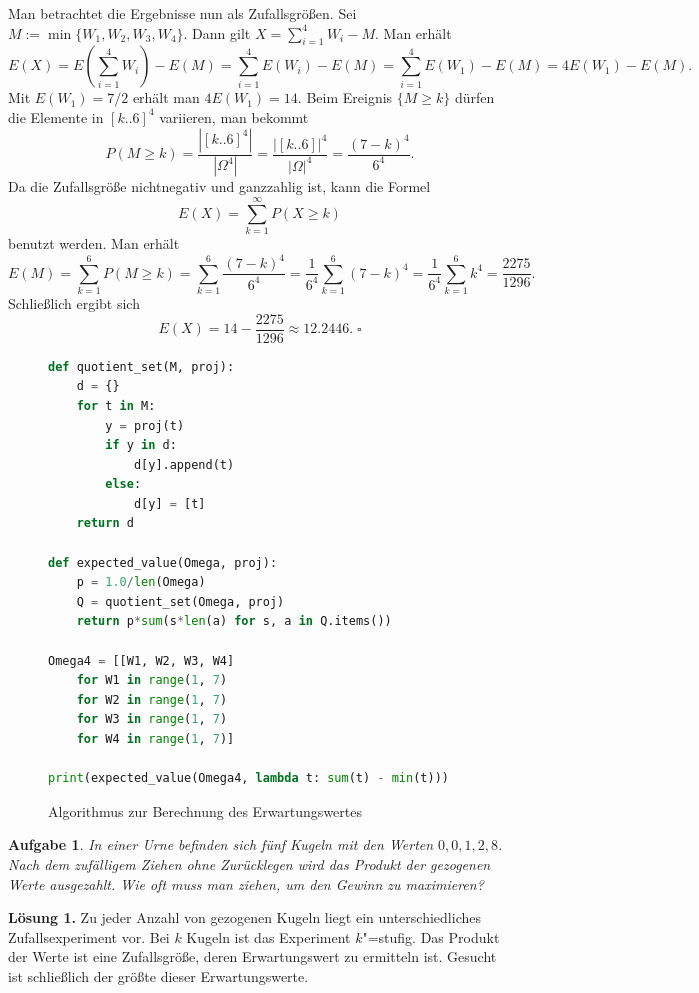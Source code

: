 \documentclass[a4paper,10pt,fleqn,twoside]{scrartcl}
\numberwithin{equation}{section}
\newcommand{\strong}[1]{{\normalfont\sffamily\bfseries #1}}
\renewcommand{\qedsymbol}{\ensuremath{\square}}
\theoremstyle{Aufgabe}
\newtheorem{Aufgabe}{\sffamily Aufgabe}[section]
\begin{document}
Man betrachtet die Ergebnisse nun als Zufallsgrößen. Sei
$M:=\min\{W_1,W_2,W_3,W_4\}$. Dann gilt $X=\sum_{i=1}^4 W_i-M$.
Man erhält
\[E(X) = E(\sum_{i=1}^4 W_i)-E(M) = \sum_{i=1}^4 E(W_i)-E(M)
= \sum_{i=1}^4 E(W_1)-E(M) = 4E(W_1)-E(M).\]
Mit $E(W_1)=7/2$ erhält man $4E(W_1)=14$. Beim Ereignis
$\{M\ge k\}$ dürfen die Elemente in
$[k..6]^4$ variieren, man bekommt%
\[P(M\ge k) = \frac{|[k..6]^4|}{|\Omega^4|}
= \frac{|[k..6]|^4}{|\Omega|^4} = \frac{(7-k)^4}{6^4}.\]
Da die Zufallsgröße nichtnegativ und ganzzahlig ist, kann die Formel%
\[E(X) = \sum_{k=1}^\infty P(X\ge k)\]
benutzt werden. Man erhält
\[E(M) = \sum_{k=1}^6 P(M\ge k) = \sum_{k=1}^6 \frac{(7-k)^4}{6^4}
= \frac{1}{6^4}\sum_{k=1}^6 (7-k)^4 = \frac{1}{6^4}\sum_{k=1}^6 k^4
= \frac{2275}{1296}.\]
Schließlich ergibt sich
\[E(X) = 14-\frac{2275}{1296} \approx 12.2446.\;\qedsymbol\]

\begin{figure}[t]
\begin{lstlisting}[language=Python]
def quotient_set(M, proj):
    d = {}
    for t in M:
        y = proj(t)
        if y in d:
            d[y].append(t)
        else:
            d[y] = [t]
    return d

def expected_value(Omega, proj):
    p = 1.0/len(Omega)
    Q = quotient_set(Omega, proj)
    return p*sum(s*len(a) for s, a in Q.items())

Omega4 = [[W1, W2, W3, W4]
    for W1 in range(1, 7)
    for W2 in range(1, 7)
    for W3 in range(1, 7)
    for W4 in range(1, 7)]
    
print(expected_value(Omega4, lambda t: sum(t) - min(t)))
\end{lstlisting}
\caption{Algorithmus zur Berechnung des Erwartungswertes}
\label{fig:Algorithmus-Erwartungswert}
\end{figure}

\begin{Aufgabe}
In einer Urne befinden sich fünf Kugeln mit den Werten $0,0,1,2,8$.
Nach dem zufälligem Ziehen ohne Zurücklegen wird das Produkt der
gezogenen Werte ausgezahlt. Wie oft muss man ziehen, um den Gewinn zu
maximieren?
\end{Aufgabe}
\strong{Lösung 1.} Zu jeder Anzahl von gezogenen Kugeln liegt ein
unterschiedliches Zufallsexperiment vor. Bei $k$ Kugeln ist das
Experiment $k$"=stufig. Das Produkt der Werte ist eine Zufallsgröße,
deren Erwartungswert zu ermitteln ist. Gesucht ist schließlich der
größte dieser Erwartungswerte.
\end{document}
